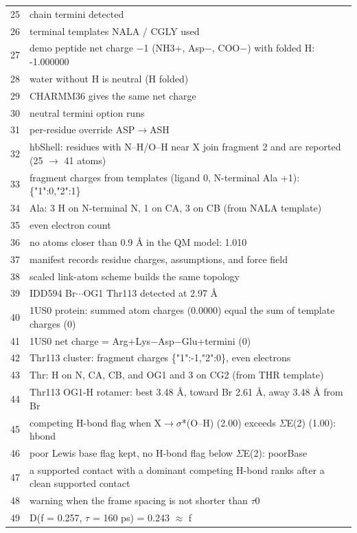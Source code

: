 {\begin{longtable}{rp{14.5cm}}
25 & chain termini detected\\
26 & terminal templates NALA / CGLY used\\
27 & demo peptide net charge $-$1 (NH3+, Asp$-$, COO$-$) with folded H: -1.000000\\
28 & water without H is neutral (H folded)\\
29 & CHARMM36 gives the same net charge\\
30 & neutral termini option runs\\
31 & per-residue override ASP$\to$ASH\\
32 & hbShell: residues with N--H/O--H near X join fragment 2 and are reported (25 $\to$ 41 atoms)\\
33 & fragment charges from templates (ligand 0, N-terminal Ala +1): \{"1":0,"2":1\}\\
34 & Ala: 3 H on N-terminal N, 1 on CA, 3 on CB (from NALA template)\\
35 & even electron count\\
36 & no atoms closer than 0.9 \AA{} in the QM model: 1.010\\
37 & manifest records residue charges, assumptions, and force field\\
38 & scaled link-atom scheme builds the same topology\\
39 & IDD594 Br$\cdots$OG1 Thr113 detected at 2.97 \AA{}\\
40 & 1US0 protein: summed atom charges (0.0000) equal the sum of template charges (0)\\
41 & 1US0 net charge = Arg+Lys$-$Asp$-$Glu+termini (0)\\
42 & Thr113 cluster: fragment charges \{"1":-1,"2":0\}, even electrons\\
43 & Thr: H on N, CA, CB, and OG1 and 3 on CG2 (from THR template)\\
44 & Thr113 OG1-H rotamer: best 3.48 \AA{}, toward Br 2.61 \AA{}, away 3.48 \AA{} from Br\\
45 & competing H-bond flag when X$\to\sigma$*(O--H) (2.00) exceeds $\Sigma$E(2) (1.00): hbond\\
46 & poor Lewis base flag kept, no H-bond flag below $\Sigma$E(2): poorBase\\
47 & a supported contact with a dominant competing H-bond ranks after a clean supported contact\\
48 & warning when the frame spacing is not shorter than $\tau$0\\
49 & D(f = 0.257, $\tau$ = 160 ps) = 0.243 $\approx$ f\\

\end{longtable}}
